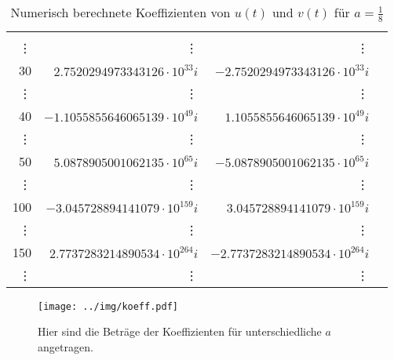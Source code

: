 \begin{table}[htbp]
\begin{center}
\begin{tabular}{|r||r|r||r|}
&
\\\vdots & \vdots                            & \vdots &
\\30     & $2.7520294973343126\cdot10^{33}i$ &
$-2.7520294973343126\cdot10^{33}i$  &
\\\vdots & \vdots                            & \vdots &
\\40     & $-1.1055855646065139\cdot10^{49}i$&
$1.1055855646065139\cdot10^{49}i$ &
\\\vdots & \vdots                            & \vdots &
\\50     & $5.0878905001062135\cdot10^{65}i$ &
$-5.0878905001062135\cdot10^{65}i$  &
\\\vdots & \vdots                            & \vdots &
\\100    & $-3.045728894141079\cdot10^{159}i$&
$3.045728894141079\cdot10^{159}i$ &
\\\vdots & \vdots                            & \vdots &
\\150    & $2.7737283214890534\cdot10^{264}i$&
$-2.7737283214890534\cdot10^{264}i$ &
\\\vdots & \vdots                            & \vdots &
\\ \hline
\end{tabular} 
\caption{Numerisch berechnete Koeffizienten von $u(t)$ und $v(t)$ für $a=\frac{1}{8}$}
\label{tab:koeff_a=0.125}
\end{center} 
\end{table}

\begin{figure}[htbp]
  \centering
  \texttt{[image: ../img/koeff.pdf]}
  \caption[Koeffizienten in abhängigkeit von $a$]
   {Hier sind die Beträge der Koeffizienten für unterschiedliche $a$ 
    angetragen.}
\end{figure}

